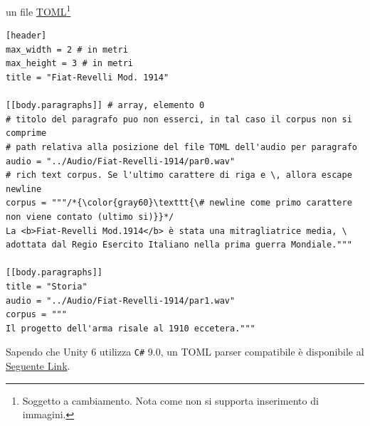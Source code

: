 \documentclass[10pt, openany]{article}
\begin{document}
  un file \href{https://toml.io/en/v1.0.0}{TOML}\footnote{Soggetto a cambiamento. Nota come non si supporta inserimento di immagini.}
  \begin{lstlisting}[style=toml]
[header]
max_width = 2 # in metri
max_height = 3 # in metri
title = "Fiat-Revelli Mod. 1914"

[[body.paragraphs]] # array, elemento 0
# titolo del paragrafo puo non esserci, in tal caso il corpus non si comprime
# path relativa alla posizione del file TOML dell'audio per paragrafo
audio = "../Audio/Fiat-Revelli-1914/par0.wav"
# rich text corpus. Se l'ultimo carattere di riga e \, allora escape newline
corpus = """/*{\color{gray60}\texttt{\# newline come primo carattere non viene contato (ultimo si)}}*/
La <b>Fiat-Revelli Mod.1914</b> è stata una mitragliatrice media, \
adottata dal Regio Esercito Italiano nella prima guerra Mondiale."""

[[body.paragraphs]]
title = "Storia"
audio = "../Audio/Fiat-Revelli-1914/par1.wav"
corpus = """
Il progetto dell'arma risale al 1910 eccetera."""
  \end{lstlisting}
Sapendo che Unity 6 utilizza \texttt{C\#} 9.0, un TOML parser compatibile \`e disponibile al \href{https://github.com/dezhidki/Tommy}{Seguente Link}.
\end{document}
